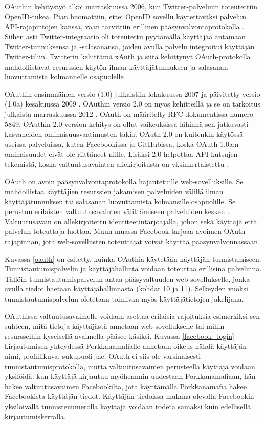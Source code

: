 OAuthin kehitystyö alkoi marraskuussa 2006, kun Twitter-pal\-ve\-luun toteutettiin \mbox{OpenID-tukea}. Pian huomattiin, ettei OpenID sovellu käytettäväksi palvelun API-ra\-ja\-pin\-to\-jen kanssa, vaan tarvittiin erillinen pääsynvalvontaprotokolla \cite{oauth_primer}. Siihen asti Twitter-integraatio oli toteutettu pyytämällä käyttäjää antamaan Twitter-tun\-nuk\-sen\-sa ja -salasanansa, joiden avulla palvelu integroitui käyttäjän Twitter-tiliin. Twitterin kehittämä xAuth ja siitä kehittynyt OAuth-protokolla mahdollistavat resurssien käytön ilman käyttäjätunnuksen ja salasanan luovuttamista kolmannelle osapuolelle \cite{oauth2_0}.

OAuthin ensimmäinen versio (1.0) julkaistiin lokakuussa 2007 ja päivitetty versio (1.0a) kesäkuussa 2009 \cite{oauth2_0}. OAuthin versio 2.0 on myös kehitteillä ja se on tarkoitus julkaista marraskuussa 2012 \cite{oauth2_0}. OAuth on määritelty RFC-dokumentissa numero 5849. OAuthin 2.0-version kehitys on ollut vaikeuksissa lähinnä sen jatkuvasti kasvaneiden ominaisuusvaatimusten takia. OAuth 2.0 on kuitenkin käytössä useissa palveluissa, kuten Facebookissa ja GitHubissa, koska OAuth 1.0a:n ominaisuudet eivät ole riittäneet niille. Lisäksi 2.0 helpottaa API-kutsujen tekemistä, koska valtuutusavainten allekirjoitusta on yksinkertaistettu \cite{oauth2_0}.

OAuth on avoin pääsynvalvontaprotokolla hajautetuille web-sovelluksille. Se mahdollistaa käyttäjien resurssien jakamisen palveluiden välillä ilman käyttäjätunnuksen tai salasanan luovuttamista kolmansille osapuolille. Se perustuu erilaisten valtuutusavainten välittämiseen palveluiden kesken \cite{oauth2_0}. Valtuutusavain on allekirjoitettu identiteetintarjoajalla, johon sekä käyttäjä että palvelun toteuttaja luottaa. Muun muassa Facebook tarjoaa avoimen OAuth-rajapinnan, jota web-sovellusten toteuttajat voivat käyttää pääsynvalvonnassaan.

Kuvassa \ref{oauth} on esitetty, kuinka OAuthia käytetään käyttäjän tunnistamiseen. Tunnistautumispalvelin ja käyttäjähallinta voidaan toteuttaa erillisinä palveluina. Tällöin tunnistautumispalvelun antaa pääsyvaltuuden web-sovellukselle, jonka avulla tiedot haetaan käyttäjähallinnasta (kohdat 10 ja 11). Selkeyden vuoksi tunnistautumispalvelun oletetaan toimivan myös käyttäjätietojen jakelijana.

OAuthissa valtuutusavaimelle voidaan asettaa erilaisia rajoituksia esimerkiksi sen suhteen, mitä tietoja käyttäjästä annetaan web-sovellukselle tai mihin resursseihin kyseisellä avaimella pääsee käsiksi. Kuvassa \ref{facebook_login} kirjautumisen yhteydessä Porkkanamafialle annetaan oikeus nähdä käyttäjän nimi, profiilikuva, sukupuoli jne. OAuth ei siis ole varsinaisesti tunnistautumisprotokolla, mutta valtuutusavaimen perusteella käyttäjä voidaan yksilöidä: kun käyttäjä kirjautuu myöhemmin uudestaan Porkkanamafiaan, hän hakee valtuutusavaimen Facebookilta, jota käyttämällä Porkkanamafia hakee Facebookista käyttäjän tiedot. Käyttäjän tiedoissa mukana olevalla Facebookin yksilöivällä tunnistenumerolla käyttäjä voidaan todeta samaksi kuin edellisellä kirjautumiskerralla.

